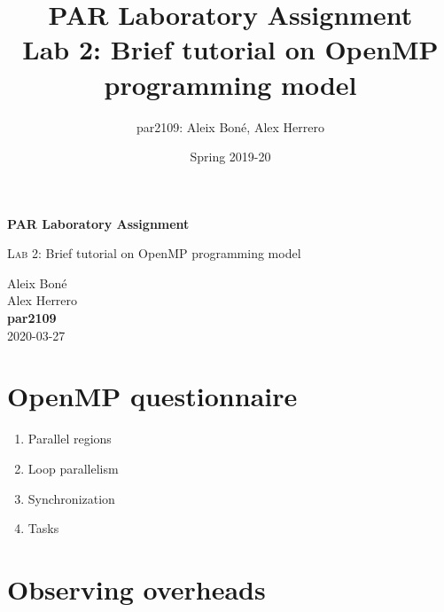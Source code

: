 

\usepackage{caption}
\usepackage{subcaption}
\usepackage{graphicx}

\usepackage{siunitx}

\renewcommand\theadfont{\bfseries}

\title{
    PAR Laboratory Assignment\\
    Lab 2: Brief tutorial on OpenMP programming model
}

\author{
    par2109:
    Aleix Boné,
    Alex Herrero
}

\date{
    Spring 2019-20
}



\thispagestyle{empty}
\clearpage
\setcounter{page}{-1}

\begin{titlepage}
{
    \centering
    \null
    \vfill
    {\Huge \bfseries PAR Laboratory Assignment\par}
    \vspace{3em}
    {\Large {\scshape Lab 2:} Brief tutorial on OpenMP programming model\par}
    \vfill
\begin{center}
\end{center}
    \vspace{3cm}

    \vfill
    {\raggedleft \Large
        Aleix Boné\\
        Alex Herrero\\
        {\bfseries\ttfamily par2109}\\
        \vspace{4em}
        2020-03-27
        \par}
}
\end{titlepage}

\pagebreak


\section{OpenMP questionnaire}%
\label{sec:OpenMP questionnaire}

\begin{enumerate}
    \item Parallel regions
    \item Loop parallelism
    \item Synchronization
    \item Tasks
\end{enumerate}

\section{Observing overheads}%
\label{sec:observing_overheads}


